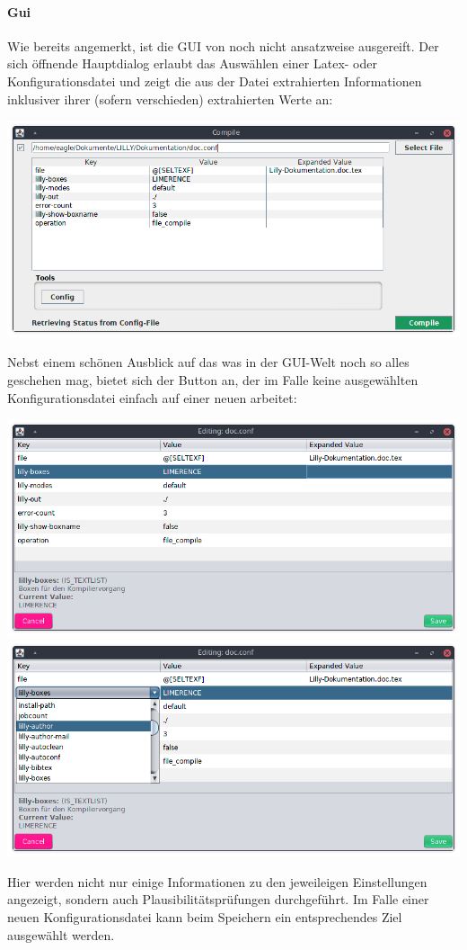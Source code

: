 \paragraph{Gui}
Wie bereits angemerkt, ist die GUI von \Jake noch nicht ansatzweise ausgereift. Der sich öffnende Hauptdialog erlaubt das Auswählen einer Latex- oder Konfigurationsdatei und zeigt die aus der Datei extrahierten Informationen inklusiver ihrer (sofern verschieden) extrahierten Werte an:
\begin{center}
    \includegraphics[width=0.75\linewidth]{Data/Bilder/JakeGUIMain.png}
\end{center}
Nebst einem schönen Ausblick auf das was in der GUI-Welt noch so alles geschehen mag, bietet sich der Button  an, der im Falle keine ausgewählten Konfigurationsdatei einfach auf einer neuen arbeitet:
\begin{center}
    \includegraphics[width=0.5\linewidth]{Data/Bilder/JakeGUIConfig.png}\includegraphics[width=0.5\linewidth]{Data/Bilder/JakeGUIConfigSelection.png}
\end{center}
Hier werden nicht nur einige Informationen zu den jeweileigen Einstellungen angezeigt, sondern auch Plausibilitätsprüfungen durchgeführt. Im Falle einer neuen Konfigurationsdatei kann beim Speichern ein entsprechendes Ziel ausgewählt werden.

